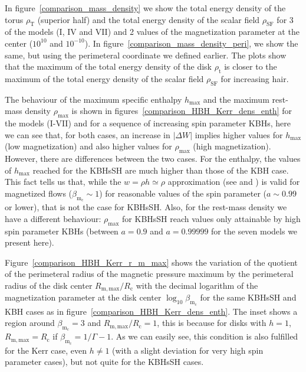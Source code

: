 \documentclass[twocolumn,aps,showpacs,showkeys,prd,superscriptaddress,byrevtex, amsmath]{revtex4-1}
\begin{document}
In figure~\ref{comparison_mass_density} we show the total energy density of the torus $\rho_{\mathrm{T}}$ (superior half) and the total energy density of the scalar field $\rho_{\mathrm{SF}}$ for 3 of the models (I, IV and VII) and 2 values of the magnetization parameter at the center ($10^{10}$ and $10^{-10}$). In figure~\ref{comparison_mass_density_peri}, we show the same, but using the perimeteral coordinate we defined earlier. The plots show that the maximum of the total energy density of the disk $\rho_{\mathrm{t}}$ is closer to the maximum of the total energy density of the scalar field $\rho_{\mathrm{SF}}$ for increasing hair.

The behaviour of the maximum specific enthalpy $h_{\mathrm{max}}$ and the maximum rest-mass density $\rho_{\mathrm{max}}$ is shown in figures~\ref{comparison_HBH_Kerr_dens_enth} for the models (I-VII) and for a sequence of increasing spin parameter KBHs, here we can see that, for both cases, an increase in $|\Delta W|$ implies higher values for $h_{\mathrm{max}}$ (low magnetization) and also higher values for $\rho_{\mathrm{max}}$ (high magnetization). However, there are differences between the two cases. For the enthalpy, the values of $h_{\mathrm{max}}$ reached for the KBHsSH are much higher than those of the KBH case. This fact tells us that, while the $w = \rho h \simeq \rho$ approximation (see \cite{Komissarov:2006} and \cite{Gimeno-Soler:2017}) is valid for magnetized flows ($\beta_{\mathrm{m_c}} \sim 1$) for reasonable values of the spin parameter ($a \sim 0.99$ or lower), that is not the case for KBHsSH. Also, for the rest-mass density we have a different behaviour: $\rho_{\mathrm{max}}$ for KBHsSH reach values only attainable by high spin parameter KBHs (between $a = 0.9$ and $a = 0.99999$ for the seven models we present here).

Figure~\ref{comparison_HBH_Kerr_r_m_max} shows the variation of the quotient of the perimeteral radius of the magnetic pressure maximum by the perimeteral radius of the disk center $R_{\mathrm{m, max}}/R_{\mathrm{c}}$ with the decimal logarithm of the magnetization parameter at the disk center $\log_{10} \beta_{\mathrm{m_c}}$ for the same KBHsSH and KBH cases as in figure~\ref{comparison_HBH_Kerr_dens_enth}. The inset shows a region around $\beta_{\mathrm{m_c}} = 3$ and $R_{\mathrm{m, max}}/R_{\mathrm{c}} = 1$, this is because for disks with $h = 1$, $R_{\mathrm{m, max}} = R_{\mathrm{c}}$ if $\beta_{\mathrm{m_c}} = 1 / \Gamma - 1$. As we can easily see, this condition is also fulfilled for the Kerr case, even $h \neq 1$ (with a slight deviation for very high spin parameter cases), but not quite for the KBHsSH cases.
\end{document}
